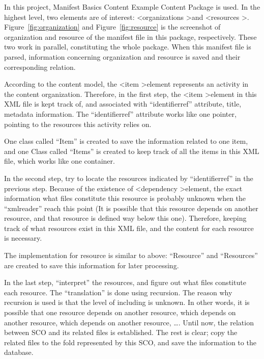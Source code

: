 In this project, Manifest Basics Content Example Content Package \cite{mbce_package} is used. In the highest level, two elements are of interest: 
\textless organizations \textgreater and \textless resources \textgreater. Figure~\ref{fig:organization} and Figure~\ref{fig:resource} is the 
screenshot of organization and resource of the manifest file in this package, respectively. These two work in parallel, constituting the whole 
package. When this manifest file is parsed, information concerning organization and resource is saved and their corresponding relation.

According to the content model, the \textless item \textgreater element represents an activity in the content organization. Therefore, in the first 
step, the \textless item \textgreater element in this XML file is kept track of, and associated with ``identifierref'' attribute, title, metadata 
information. The ``identifierref'' attribute works like one pointer, pointing to the resources this activity relies on.

One class called ``Item'' is created to save the information related to one item, and one Class called ``Items'' is created to keep track of all the 
items in this XML file, which works like one container.

In the second step, try to locate the resources indicated by ``identifierref'' in the previous step. Because of the existence of \textless dependency 
\textgreater element, the exact information what files constitute this resource is probably unknown when the ``xmlreader'' reach this point (It is 
possible that this resource depends on another resource, and that resource is defined way below this one). Therefore, keeping track of what resources 
exist in this XML file, and the content for each resource is necessary.

The implementation for resource is similar to above: ``Resource'' and ``Resources'' are created to save this information for later processing.

In the last step, ``interpret'' the resources, and figure out what files constitute each resource. The ``translation'' is done using recursion. The 
reason why recursion is used is that the level of including is unknown. In other words, it is possible that one resource depends on another resource, 
which depends on another resource, which depends on another resource, \ldots. Until now, the relation between SCO and its related files is 
established. The rest is clear; copy the related files to the fold represented by this SCO, and save the information to the database.

